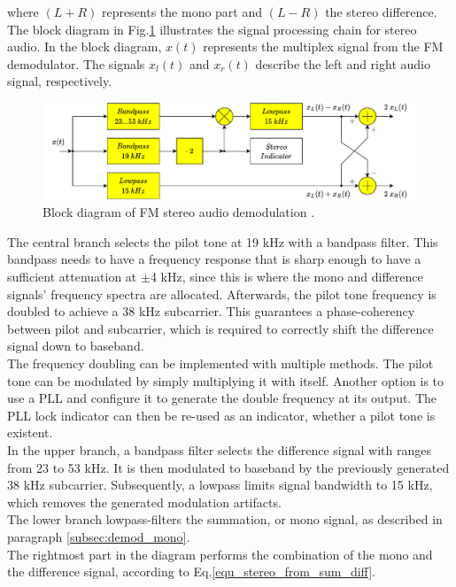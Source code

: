 where $(L+R)$ represents the mono part and $(L-R)$ the stereo difference.\\

The block diagram in Fig.\ref{fig_bd_stereo_demod} illustrates the signal processing chain for stereo audio.
In the block diagram, $x(t)$ represents the multiplex signal from the FM demodulator.
The signals $x_l(t)$ and $x_r(t)$ describe the left and right audio signal, respectively.\\

\begin{figure}[!h]
  \centering
    \includegraphics[width=1.0\textwidth]{img/draw.io/bd_fm_demod_stereo_audio}
  \caption{Block diagram of FM stereo audio demodulation \cite{RoppelBegleitmaterial}.}
  \label{fig_bd_stereo_demod}
\end{figure}

The central branch selects the pilot tone at 19 kHz with a bandpass filter.
This bandpass needs to have a frequency response that is sharp enough to have a sufficient attenuation at $\pm$4 kHz, since this is where the mono and difference signals' frequency spectra are allocated.
Afterwards, the pilot tone frequency is doubled to achieve a 38 kHz subcarrier.
This guarantees a phase-coherency between pilot and subcarrier, which is required to correctly shift the difference signal down to baseband.\\

The frequency doubling can be implemented with multiple methods.
The pilot tone can be modulated by simply multiplying it with itself.
Another option is to use a PLL and configure it to generate the double frequency at its output.
The PLL lock indicator can then be re-used as an indicator, whether a pilot tone is existent.\\

In the upper branch, a bandpass filter selects the difference signal with ranges from 23 to 53 kHz.
It is then modulated to baseband by the previously generated 38 kHz subcarrier.
Subsequently, a lowpass limits signal bandwidth to 15 kHz, which removes the generated modulation artifacts.\\

The lower branch lowpass-filters the summation, or mono signal, as described in paragraph \ref{subsec:demod_mono}.\\

The rightmost part in the diagram performs the combination of the mono and the difference signal, according to Eq.\eqref{equ_stereo_from_sum_diff}.
